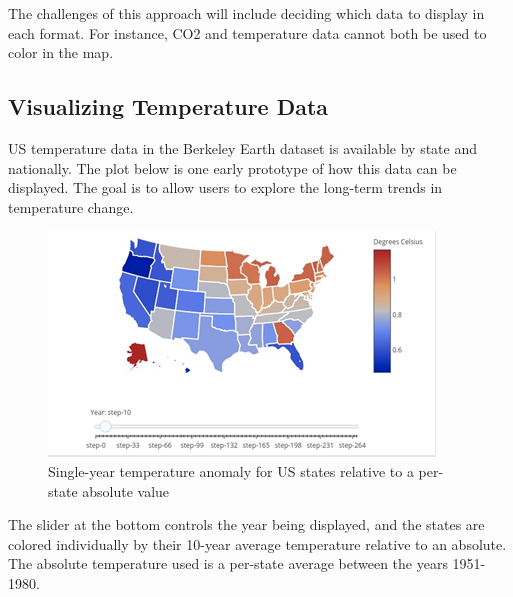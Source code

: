 \documentclass[sigconf,nonacm=true]{acmart}
\begin{document}
The challenges of this approach will include deciding which data to display in each format. For instance, CO2 and temperature data cannot both be used to color in the map. 

\subsection{Visualizing Temperature Data}
US temperature data in the Berkeley Earth dataset is available by state and nationally. The plot below is one early prototype of how this data can be displayed. The goal is to allow users to explore the long-term trends in temperature change.  
\begin{figure}[H]
	\centering
	\includegraphics[width=0.9\linewidth]{images/tempMap}
	\caption{Single-year temperature anomaly for US states relative to a per-state absolute value}
	\label{fig:tempMap}
\end{figure}
The slider at the bottom controls the year being displayed, and the states are colored individually by their 10-year average temperature relative to an absolute. The absolute temperature used is a per-state average between the years 1951-1980. 
\end{document}
